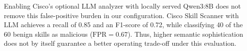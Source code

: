 Enabling Cisco's optional LLM analyzer with locally served Qwen3:8B
does not remove this false-positive burden in our configuration.
Cisco Skill Scanner with LLM achieves a recall of 0.85 and an F1-score of 0.72, while
classifying 40 of the 60 benign skills as malicious
($\mathrm{FPR}=0.67$). 
Thus, higher semantic sophistication does not by itself guarantee a better operating trade-off under this evaluation.








